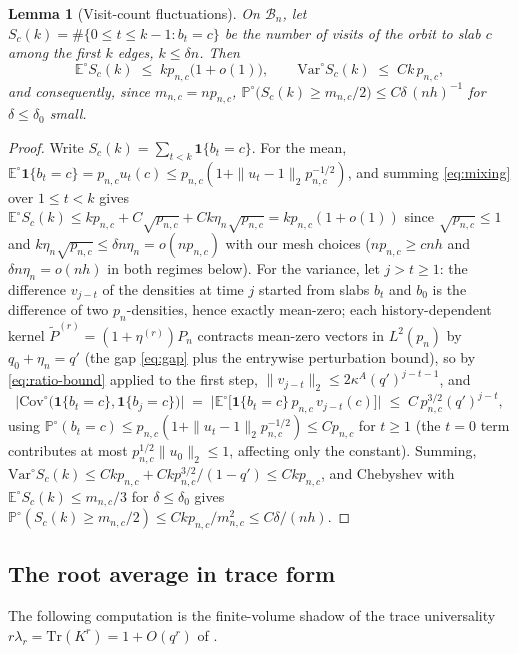 \documentclass[11pt]{article}
\newcommand{\E}{\mathbb{E}}
\newcommand{\Prob}{\mathbb{P}}
\newcommand{\1}{\mathbf{1}}
\newcommand{\Var}{\mathrm{Var}}
\newcommand{\Cov}{\mathrm{Cov}}
\newcommand{\Tr}{\mathrm{Tr}}
\newcommand{\cB}{\mathcal{B}}
\newtheorem{lemma}[theorem]{Lemma}
\theoremstyle{remark}
\begin{document}
\begin{lemma}[Visit-count fluctuations]\label{lem:visits}
On $\cB_n$, let $S_c(k)=\#\{0\le t\le k-1:b_t=c\}$ be the number of visits
of the orbit to slab $c$ among the first $k$ edges, $k\le\delta n$. Then
\begin{equation}\label{eq:visits}
\E^\circ S_c(k)\;\le\;k p_{n,c}\bigl(1+o(1)\bigr),
\qquad
\Var^\circ S_c(k)\;\le\;C k\,p_{n,c},
\end{equation}
and consequently, since $m_{n,c}=np_{n,c}$,
$\Prob^\circ\bigl(S_c(k)\ge m_{n,c}/2\bigr)
\le C\delta\,(nh)^{-1}$ for $\delta\le\delta_0$ small.
\end{lemma}

\begin{proof}
Write $S_c(k)=\sum_{t<k}\1\{b_t=c\}$. For the mean,
$\E^\circ\1\{b_t=c\}=p_{n,c}u_t(c)\le p_{n,c}(1+\|u_t-1\|_2p_{n,c}^{-1/2})$,
and summing \eqref{eq:mixing} over $1\le t<k$ gives
$\E^\circ S_c(k)\le kp_{n,c}+C\sqrt{p_{n,c}}
+Ck\eta_n\sqrt{p_{n,c}}=kp_{n,c}(1+o(1))$ since
$\sqrt{p_{n,c}}\le1$ and $k\eta_n\sqrt{p_{n,c}}\le
\delta n\eta_n=o(np_{n,c})$ with our mesh choices
($np_{n,c}\ge cnh$ and $\delta n\eta_n=o(nh)$ in both regimes below).
For the variance, let $j>t\ge1$: the difference $v_{j-t}$ of the densities
at time $j$ started from slabs $b_t$ and $b_0$ is the difference of two
$p_n$-densities, hence exactly mean-zero; each history-dependent kernel
$\tilde P^{(r)}=(1+\eta^{(r)})P_n$ contracts mean-zero vectors in
$L^2(p_n)$ by $q_0+\eta_n=q'$ (the gap \eqref{eq:gap} plus the entrywise
perturbation bound), so by \eqref{eq:ratio-bound} applied to the first step,
$\|v_{j-t}\|_2\le2\kappa^A(q')^{j-t-1}$, and
\[
\bigl|\Cov^\circ\bigl(\1\{b_t=c\},\1\{b_j=c\}\bigr)\bigr|
\;=\;\bigl|\E^\circ\bigl[\1\{b_t=c\}\,p_{n,c}\,v_{j-t}(c)\bigr]\bigr|
\;\le\;C\,p_{n,c}^{3/2}(q')^{j-t},
\]
using $\Prob^\circ(b_t=c)\le p_{n,c}(1+\|u_t-1\|_2p_{n,c}^{-1/2})
\le Cp_{n,c}$ for $t\ge1$ (the $t=0$ term contributes at most
$p_{n,c}^{1/2}\|u_0\|_2\le1$, affecting only the constant). Summing,
$\Var^\circ S_c(k)\le Ckp_{n,c}+Ckp_{n,c}^{3/2}/(1-q')\le Ckp_{n,c}$, and
Chebyshev with $\E^\circ S_c(k)\le m_{n,c}/3$ for $\delta\le\delta_0$
gives $\Prob^\circ(S_c(k)\ge m_{n,c}/2)\le
Ckp_{n,c}/m_{n,c}^2\le C\delta/(nh)$.
\end{proof}

\subsection{The root average in trace form}
The following computation is the finite-volume shadow of the trace
universality $r\lambda_r=\Tr(K^r)=1+O(q^r)$ of
\cite[Theorem~5.19]{Lon26}.
\end{document}
